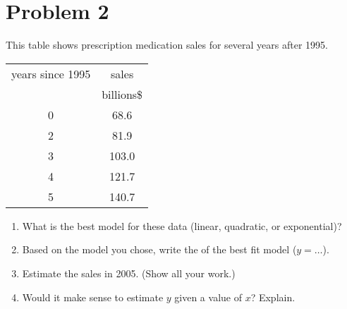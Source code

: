 \section*{Problem 2}

\begin{minipage}{0.29\textwidth}
    This table shows prescription medication sales for several years after 1995.
    \begin{center}
        \begin{tabular}{c|c}
            \toprule
            years since 1995 & sales \\
                             & {billions\$} \\
            \midrule 
            0 & 68.6 \\
            2 & 81.9 \\ 
            3 & 103.0 \\ 
            4 & 121.7 \\ 
            5 & 140.7 \\
            \bottomrule
        \end{tabular}
    \end{center}
\end{minipage}
%
\begin{minipage}{0.7\textwidth}
    \begin{enumerate}[label=(\alph*)]
        \item What is the best model for these data (linear, quadratic, or exponential)?
            \vspace{1\onelineskip}
        \item Based on the model you chose, write the  of the best fit model ($y = \dots$).
        \vspace{1\onelineskip}
        \item Estimate the sales in 2005. (Show all your work.)
        \vspace{3\onelineskip}
        \item Would it make sense to estimate $y$ given a  value of $x$?
            Explain.
        \vspace{5\onelineskip}
    \end{enumerate}
\end{minipage}

